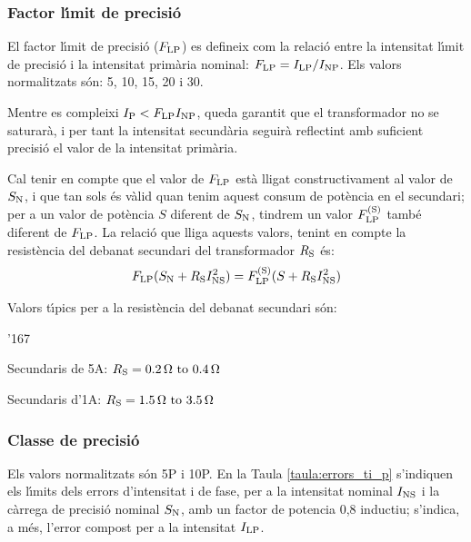 \subsubsection{Factor l\'{\i}mit de precisi\'{o}}

 El factor l\'{\i}mit de precisi\'{o}
($F_\mathrm{LP}$) es defineix com la relaci\'{o} entre la intensitat l\'{\i}mit de precisi\'{o}
i la intensitat prim\`{a}ria nominal: $F_\mathrm{LP} = I_\mathrm{LP} /I_\mathrm{NP}$.
Els valors normalitzats s\'{o}n: 5, 10, 15, 20 i 30.

Mentre es compleixi  $I_\mathrm{P}<F_\mathrm{LP} I_\mathrm{NP}$, queda garantit
que el transformador no se saturar\`{a}, i per tant la intensitat
secund\`{a}ria seguir\`{a} reflectint amb suficient precisi\'{o} el valor de la
intensitat prim\`{a}ria.

Cal tenir en compte que el valor de $F_\mathrm{LP}$ est\`{a} lligat
constructivament al valor de $S_\mathrm{N}$, i que tan sols \'{e}s v\`{a}lid
quan tenim aquest consum de  pot\`{e}ncia en el secundari; per a un
valor de pot\`{e}ncia $S$ diferent de $S_\mathrm{N}$, tindrem un valor
$F_\mathrm{LP}^\mathrm{(S)}$ tamb\'{e} diferent de  $F_\mathrm{LP}$. La relaci\'{o} que
lliga aquests valors, tenint en compte la resist\`{e}ncia del debanat
secundari del transformador  $R_\mathrm{S}$ \'{e}s:
\begin{equation}\label{eq:flp}
    F_\mathrm{LP} (S_\mathrm{N}+R_\mathrm{S}I_\mathrm{NS}^2) =
    F_\mathrm{LP}^\mathrm{(S)} (S+R_\mathrm{S}I_\mathrm{NS}^2)
\end{equation}

Valors t\'{\i}pics per a la resist\`{e}ncia del debanat secundari s\'{o}n:
\begin{dinglist}{'167}
    \item Secundaris de 5\unit{A}: $R\ped{S} = \SIrange{0,2}{0,4}{\ohm}$
    \item Secundaris d'1\unit{A}:  $R\ped{S} = \SIrange{1,5}{3,5}{\ohm}$
\end{dinglist}

\subsubsection{Classe de precisi\'{o}}

 Els valors normalitzats s\'{o}n 5P i 10P.
En la Taula \vref{taula:errors_ti_p} s'indiquen els l\'{\i}mits dels
errors d'intensitat i de fase,  per a la intensitat nominal
$I_\mathrm{NS}$ i  la c\`{a}rrega de precisi\'{o} nominal $S_\mathrm{N}$,  amb un
factor de potencia 0,8 inductiu; s'indica, a m\'{e}s, l'error
compost per a la intensitat $I_\mathrm{LP}$.

